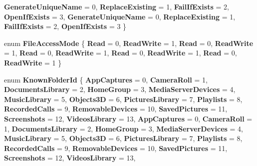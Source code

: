 \begin{DoxyCompactItemize}
\newline
{\bfseries Generate\+Unique\+Name} = 0, 
{\bfseries Replace\+Existing} = 1, 
{\bfseries Fail\+If\+Exists} = 2, 
{\bfseries Open\+If\+Exists} = 3, 
\newline
{\bfseries Generate\+Unique\+Name} = 0, 
{\bfseries Replace\+Existing} = 1, 
{\bfseries Fail\+If\+Exists} = 2, 
{\bfseries Open\+If\+Exists} = 3
 \}
\item 
\mbox{\label{namespace_windows_1_1_storage_a5692c3d5d5dc5255f90f05e0a6c3ae9e}} 
enum {\bfseries File\+Access\+Mode} \{ \newline
{\bfseries Read} = 0, 
{\bfseries Read\+Write} = 1, 
{\bfseries Read} = 0, 
{\bfseries Read\+Write} = 1, 
\newline
{\bfseries Read} = 0, 
{\bfseries Read\+Write} = 1, 
{\bfseries Read} = 0, 
{\bfseries Read\+Write} = 1, 
\newline
{\bfseries Read} = 0, 
{\bfseries Read\+Write} = 1
 \}
\item 
\mbox{\label{namespace_windows_1_1_storage_ad806137f79e39155cbf64fd8e1e6de11}} 
enum {\bfseries Known\+Folder\+Id} \{ \newline
{\bfseries App\+Captures} = 0, 
{\bfseries Camera\+Roll} = 1, 
{\bfseries Documents\+Library} = 2, 
{\bfseries Home\+Group} = 3, 
\newline
{\bfseries Media\+Server\+Devices} = 4, 
{\bfseries Music\+Library} = 5, 
{\bfseries Objects3D} = 6, 
{\bfseries Pictures\+Library} = 7, 
\newline
{\bfseries Playlists} = 8, 
{\bfseries Recorded\+Calls} = 9, 
{\bfseries Removable\+Devices} = 10, 
{\bfseries Saved\+Pictures} = 11, 
\newline
{\bfseries Screenshots} = 12, 
{\bfseries Videos\+Library} = 13, 
{\bfseries App\+Captures} = 0, 
{\bfseries Camera\+Roll} = 1, 
\newline
{\bfseries Documents\+Library} = 2, 
{\bfseries Home\+Group} = 3, 
{\bfseries Media\+Server\+Devices} = 4, 
{\bfseries Music\+Library} = 5, 
\newline
{\bfseries Objects3D} = 6, 
{\bfseries Pictures\+Library} = 7, 
{\bfseries Playlists} = 8, 
{\bfseries Recorded\+Calls} = 9, 
\newline
{\bfseries Removable\+Devices} = 10, 
{\bfseries Saved\+Pictures} = 11, 
{\bfseries Screenshots} = 12, 
{\bfseries Videos\+Library} = 13, 
\newline

\end{DoxyCompactItemize}

